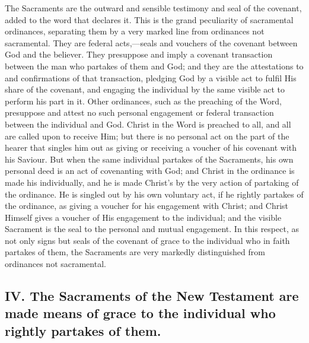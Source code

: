 \documentclass[]{book}
\begin{document}
The Sacraments are the outward and sensible testimony and seal of the covenant, added to the word that declares it. This is the grand peculiarity of sacramental ordinances, separating them by a very marked line from ordinances not sacramental. They are federal acts,---seals and vouchers of the covenant between God and the believer. They presuppose and imply a covenant transaction between the man who partakes of them and God; and they are the attestations to and confirmations of that transaction, pledging God by a visible act to fulfil His share of the covenant, and engaging the individual by the same visible act to perform his part in it. Other ordinances, such as the preaching of the Word, presuppose and attest no such personal engagement or federal transaction between the individual and God. Christ in the Word is preached to all, and all are called upon to receive Him; but there is no personal act on the part of the hearer that singles him out as giving or receiving a voucher of his covenant with his Saviour. But when the same individual partakes of the Sacraments, his own personal deed is an act of covenanting with God; and Christ in the ordinance is made his individually, and he is made Christ's by the very action of partaking of the ordinance. He is singled out by his own voluntary act, if he rightly partakes of the ordinance, as giving a voucher for his engagement with Christ; and Christ Himself gives a voucher of His engagement to the individual; and the visible Sacrament is the seal to the personal and mutual engagement. In this respect, as not only signs but seals of the covenant of grace to the individual who in faith partakes of them, the Sacraments are very markedly distinguished from ordinances not sacramental.

\hypertarget{iv.-the-sacraments-of-the-new-testament-are-made-means-of-grace-to-the-individual-who-rightly-partakes-of-them.}{%
\subsection{IV. The Sacraments of the New Testament are made means of grace to the individual who rightly partakes of them.}\label{iv.-the-sacraments-of-the-new-testament-are-made-means-of-grace-to-the-individual-who-rightly-partakes-of-them.}}
\end{document}
